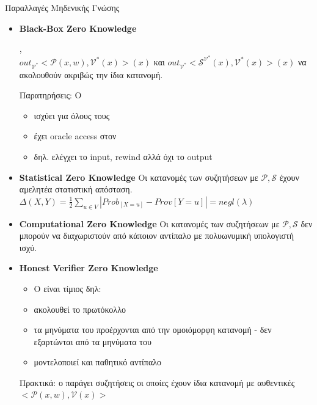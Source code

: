 \documentclass[handout]{beamer}
\begin{document}
\begin{frame}[allowframebreaks]{Παραλλαγές Μηδενικής Γνώσης}
\begin{itemize}
	\item \textbf{Black-Box Zero Knowledge} 
	
	 ,   \\
	$ out_{\mathcal{V}^*}<\mathcal{P}(x,w), \mathcal{V}^*(x)>(x) $ και $ out_{\mathcal{V}^*}<\mathcal{S}^{ \mathcal{V}^*}(x), \mathcal{V}^*(x)>(x) $ να ακολουθούν ακριβώς την ίδια κατανομή.
	
	Παρατηρήσεις: O \siml 
	\begin{itemize}
	    \item ισχύει για όλους τους \ver
	    \item έχει oracle access στον \ver
	    \item δηλ. ελέγχει το input, rewind αλλά όχι το output 
	\end{itemize}
	
	\framebreak
	
	\item \textbf{Statistical Zero Knowledge} Οι κατανομές των συζητήσεων με $\mathcal{P},\mathcal{S}$ έχουν αμελητέα στατιστική απόσταση. 
	$\Delta(X,Y) = \frac{1}{2} \sum_{u \in V}|Prob_[X=u] - Prov[Y=u]|=negl(\lambda)$
	
 	\item \textbf{Computational Zero Knowledge} Οι κατανομές των συζητήσεων με $\mathcal{P},\mathcal{S}$  δεν μπορούν να διαχωριστούν από κάποιον αντίπαλο με πολυωνυμική υπολογιστή ισχύ.
 	
	\framebreak
	
	\item \textbf{Honest Verifier Zero Knowledge}
	\begin{itemize}
	\item Ο \ver  είναι τίμιος δηλ:
	\item ακολουθεί το πρωτόκολλο
	\item τα μηνύματα του προέρχονται από την ομοιόμορφη κατανομή - δεν εξαρτώνται από τα μηνύματα του \prv 
	\item μοντελοποιεί και παθητικό αντίπαλο
	\end{itemize}	  
	Πρακτικά: ο \siml παράγει συζητήσεις οι οποίες έχουν ίδια κατανομή με αυθεντικές $<\mathcal{P}(x,w), \mathcal{V}(x)>$ 
\end{itemize}

\end{frame}
\end{document}
